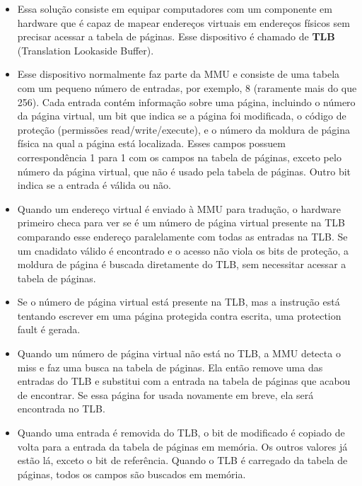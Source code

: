 \documentclass[10pt]{article}
\begin{document}
\begin{itemize}
    \item Essa solução consiste em equipar computadores com um componente em hardware
        que é capaz de mapear endereços virtuais em endereços físicos sem precisar
        acessar a tabela de páginas. Esse dispositivo é chamado de \textbf{TLB} 
        (Translation Lookaside Buffer).
    \item Esse dispositivo normalmente faz parte da MMU e consiste de uma tabela
        com um pequeno número de entradas, por exemplo, 8 (raramente mais do que 
        256). Cada entrada contém informação sobre uma página, incluindo o número
        da página virtual, um bit que indica se a página foi modificada, o código
        de proteção (permissões read/write/execute), e o número da moldura de página
        física na qual a página está localizada. Esses campos possuem correspondência
        1 para 1 com os campos na tabela de páginas, exceto pelo número da página virtual,
        que não é usado pela tabela de páginas. Outro bit indica se a entrada é válida
        ou não.
    \item Quando um endereço virtual é enviado à MMU para tradução, o hardware primeiro
        checa para ver se é um número de página virtual presente na TLB comparando 
        esse endereço paralelamente com todas as entradas na TLB. Se um cnadidato válido
        é encontrado e o acesso não viola os bits de proteção, a moldura de página é
        buscada diretamente do TLB, sem necessitar acessar a tabela de páginas.
    \item Se o número de página virtual está presente na TLB, mas a instrução está
        tentando escrever em uma página protegida contra escrita, uma protection 
        fault é gerada.
    \item Quando um número de página virtual não está no TLB, a MMU detecta o miss 
        e faz uma busca na tabela de páginas. Ela então remove uma das entradas
        do TLB e substitui com a entrada na tabela de páginas que acabou de encontrar.
        Se essa página for usada novamente em breve, ela será encontrada no TLB. 
    \item Quando uma entrada é removida do TLB, o bit de modificado é copiado de volta
        para a entrada da tabela de páginas em memória. Os outros valores já estão lá,
        exceto o bit de referência. Quando o TLB é carregado da tabela de páginas, todos
        os campos são buscados em memória.
\end{itemize}
\end{document}
